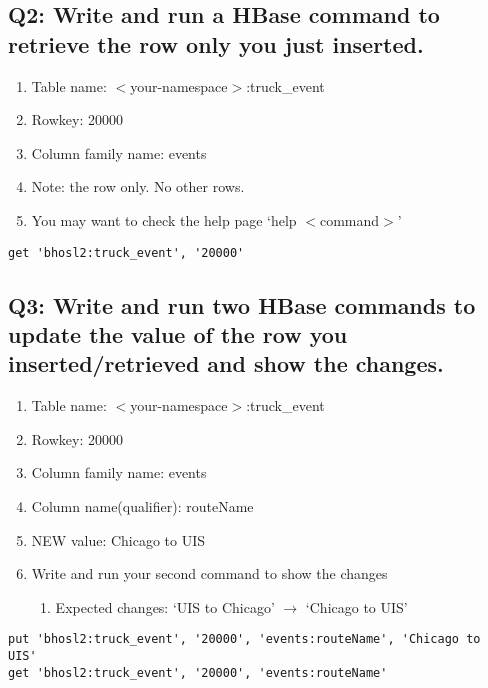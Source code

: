 \documentclass[]{article}
\begin{document}
\subsection*{Q2: Write and run a HBase command to retrieve the row only you just inserted.} 
\begin{enumerate}[before=\itshape,font=\normalfont,label=\alph*.]
	\item Table name: $<$your-namespace$>$:truck\_event
	\item Rowkey: 20000
	\item Column family name: events
	\item Note: the row only. No other rows.
	\item You may want to check the help page ‘help $<$command$>$’
\end{enumerate}

\begin{verbatim}
get 'bhosl2:truck_event', '20000'
\end{verbatim}

\subsection*{Q3: Write and run two HBase commands to update the value of the row you inserted/retrieved and show the changes.} 
\begin{enumerate}[before=\itshape,font=\normalfont,label=\alph*.]
	\item Table name: $<$your-namespace$>$:truck\_event
	\item Rowkey: 20000
	\item Column family name: events
	\item Column name(qualifier): routeName
	\item NEW value: Chicago to UIS
	\item Write and run your second command to show the changes
	\begin{enumerate}[label=\roman*.]
		\item Expected changes: ‘UIS to Chicago’ $\rightarrow$ ‘Chicago to UIS’
	\end{enumerate}
\end{enumerate}

\begin{verbatim}
put 'bhosl2:truck_event', '20000', 'events:routeName', 'Chicago to UIS'
get 'bhosl2:truck_event', '20000', 'events:routeName'
\end{verbatim}
\end{document}
